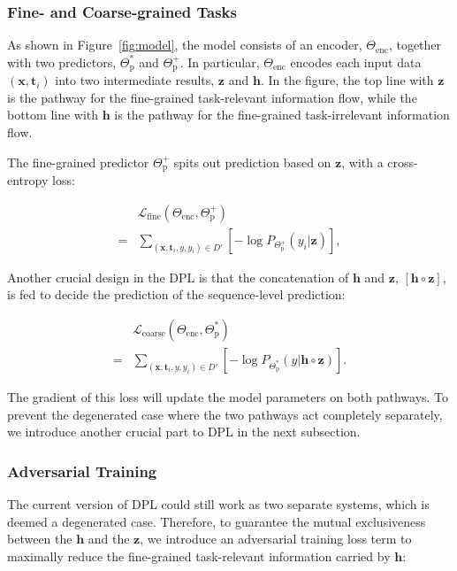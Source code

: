 \documentclass[11pt]{article}
\newcommand{\bx}{\mathbf{x}}
\newcommand{\bt}{\mathbf{t}}
\newcommand{\bz}{\mathbf{z}}
\newcommand{\bh}{\mathbf{h}}
\newcommand{\mL}{\mathcal{L}}
\begin{document}
\subsubsection{Fine- and Coarse-grained Tasks}
As shown in Figure~\ref{fig:model}, the model consists of an encoder, $\Theta_{\text{enc}}$, together with two predictors, $\Theta^*_{\text{p}}$  and $\Theta^+_{\text{p}}$. 
In particular, $\Theta_{\text{enc}}$ encodes each input data $(\bx, \bt_i)$ into two intermediate results, $\bz$ and $\bh$. 
In the figure, the top line with $\bz$ is the pathway for the fine-grained task-relevant information flow,
while the bottom line with $\bh$ is the pathway for the fine-grained task-irrelevant information flow.






The fine-grained predictor $\Theta^+_{\text{p}}$ spits out prediction based on $\bz$, with a cross-entropy loss: 

\begin{equation}
\begin{aligned}
    &\mL_{\text{fine}}(\Theta_{\text{enc}}, \Theta^+_{\text{p}}) \\ = 
    &\sum_{(\bx, \bt_i, y, y_i) \in D'} [-\log P_{\Theta^+_{\text{p}}}(y_i|\bz)],
\label{DPL-finer}
\end{aligned}
\end{equation}



Another crucial design in the DPL is that the concatenation of $\bh$ and $\bz$, $[\bh \circ \bz]$, is fed to decide the prediction of the sequence-level prediction:

\begin{equation}
\begin{aligned}
    &\mL_{\text{coarse}}(\Theta_{\text{enc}}, \Theta^*_{\text{p}}) \\
    = 
    &\sum_{(\bx, \bt_i, y, y_i) \in D'} [-\log P_{\Theta^*_{\text{p}}}(y|\bh \circ \bz)].
\label{DPL-coarse}
\end{aligned}
\end{equation}

The gradient of this loss will update the model parameters on both pathways. To prevent the degenerated case where the two pathways act completely separately, we introduce another crucial part to DPL in the next subsection.


\subsubsection{Adversarial Training}
The current version of DPL could still work as two separate systems, which is deemed a degenerated case.
Therefore, to guarantee the mutual exclusiveness between the $\bh$ and the $\bz$, we introduce an adversarial training loss term to maximally reduce the fine-grained task-relevant information carried by $\bh$:
\end{document}
